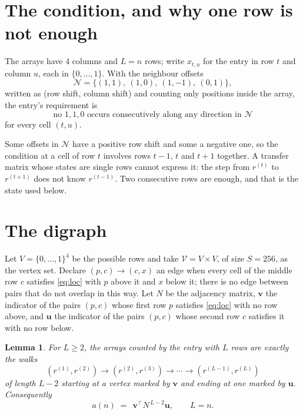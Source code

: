 \documentclass[11pt,a4paper]{article}
\theoremstyle{plain}
\newtheorem{lemma}[theorem]{Lemma}
\theoremstyle{definition}
\begin{document}
\section{The condition, and why one row is not enough}

The arrays have $4$ columns and $L=n$ rows; write $x_{t,u}$ for the entry in
row $t$ and column $u$, each in $\{0,\dots,1\}$. With the neighbour offsets
\[
\mathcal N=\{(1,1),\ (1,0),\ (1,-1),\ (0,1)\},
\]
written as (row shift, column shift) and counting only positions inside the array, the
entry's requirement is
\begin{equation}\label{eq:loc}
\text{no }1,1,0\text{ occurs consecutively along any direction in }\mathcal N
\end{equation}
for every cell $(t,u)$.

Some offsets in $\mathcal N$ have a positive row shift and some a negative one, so the
condition at a cell of row $t$ involves rows $t-1$, $t$ and $t+1$ together. A transfer
matrix whose states are single rows cannot express it: the step from $r^{(t)}$ to
$r^{(t+1)}$ does not know $r^{(t-1)}$. Two consecutive rows are enough, and that is
the state used below.

\section{The digraph}

Let $V=\{0,\dots,1\}^{4}$ be the possible rows and take
$\mathcal V=V\times V$, of size $S=256$, as the vertex set. Declare $(p,c)\to(c,x)$ an edge
when every cell of the middle row $c$ satisfies \eqref{eq:loc} with $p$ above it and $x$
below it; there is no edge between pairs that do not overlap in this way. Let $N$ be the
adjacency matrix, $\mathbf{v}$ the indicator of the pairs $(p,c)$ whose first row $p$
satisfies \eqref{eq:loc} with no row above, and $\mathbf{u}$ the indicator of
the pairs $(p,c)$ whose second row $c$ satisfies it with no row below.

\begin{lemma}\label{lem:walk}
For $L\ge2$, the arrays counted by the entry with $L$ rows are exactly the walks
\[
(r^{(1)},r^{(2)})\to(r^{(2)},r^{(3)})\to\cdots\to(r^{(L-1)},r^{(L)})
\]
of length $L-2$ starting at a vertex marked by $\mathbf{v}$ and ending at one marked by
$\mathbf{u}$. Consequently
\[
a(n)\;=\;\,\mathbf{v}^{\!\top}N^{\,L-2}\mathbf{u},\qquad L=n .
\]
\end{lemma}
\end{document}

